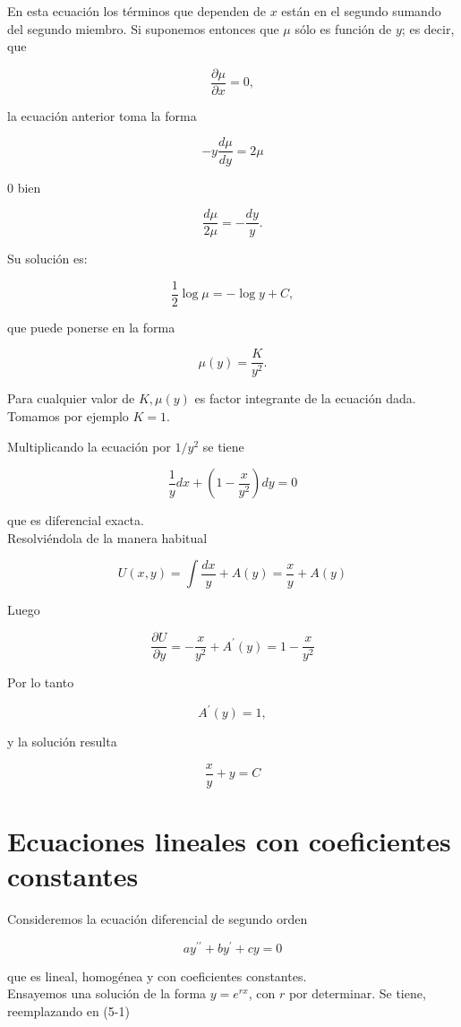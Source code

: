 \documentclass[10pt]{article}
\theoremstyle{plain}
\theoremstyle{definition}
\theoremstyle{remark}
\begin{document}
En esta ecuación los términos que dependen de $x$ están en el segundo sumando del segundo miembro. Si suponemos entonces que $\mu$ sólo es función de $y$; es decir, que

$$
\frac{\partial \mu}{\partial x}=0,
$$

la ecuación anterior toma la forma

$$
-y \frac{d \mu}{d y}=2 \mu
$$

0 bien

$$
\frac{d \mu}{2 \mu}=-\frac{d y}{y} .
$$

Su solución es:

$$
\frac{1}{2} \log \mu=-\log y+C,
$$

que puede ponerse en la forma

$$
\mu(y)=\frac{K}{y^{2}} .
$$

Para cualquier valor de $K, \mu(y)$ es factor integrante de la ecuación dada. Tomamos por ejemplo $K=1$.

Multiplicando la ecuación por $1 / y^{2}$ se tiene

$$
\frac{1}{y} d x+\left(1-\frac{x}{y^{2}}\right) d y=0
$$

que es diferencial exacta.\\
Resolviéndola de la manera habitual

$$
U(x, y)=\int \frac{d x}{y}+A(y)=\frac{x}{y}+A(y)
$$

Luego

$$
\frac{\partial U}{\partial y}=-\frac{x}{y^{2}}+A^{\prime}(y)=1-\frac{x}{y^{2}}
$$

Por lo tanto

$$
A^{\prime}(y)=1,
$$

y la solución resulta

$$
\frac{x}{y}+y=C
$$

\section{Ecuaciones lineales con coeficientes constantes}
Consideremos la ecuación diferencial de segundo orden


\begin{equation*}
a y^{\prime \prime}+b y^{\prime}+c y=0 \tag{5-1}
\end{equation*}


que es lineal, homogénea y con coeficientes constantes.\\
Ensayemos una solución de la forma $y=e^{r x}$, con $r$ por determinar. Se tiene, reemplazando en (5-1)
\end{document}
